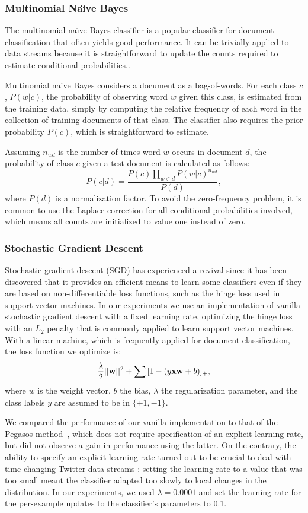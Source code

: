 \subsubsection{Multinomial Na\"{\i}ve Bayes}

The multinomial na\"{\i}ve Bayes classifier is a popular classifier
for document classification that often yields %
good performance. It can be trivially applied to data streams because it is
straightforward to update the counts required to estimate conditional
probabilities.. 

Multinomial naive Bayes considers a document as a bag-of-words. For
each class $c$, $P (w|c)$, the probability of observing word $w$ given
this class, is estimated from the training data, simply by computing
the relative frequency of each word in the collection of training
documents of that class. The classifier also requires the prior
probability $P (c)$, which is straightforward to estimate. 

Assuming $n_{wd}$ is the number of times word $w$ occurs in document
$d$, the probability of class $c$ given a test document is calculated
as follows:
$$P(c|d) =\frac{P(c) \prod_{w\in d} P(w|c)^{n_{wd}}}{P(d)},$$
where $P (d)$ is a normalization factor. To avoid the zero-frequency
problem, it is common to use the Laplace correction for all
conditional probabilities involved, which means all counts are
initialized to value one instead of zero.

\subsubsection{Stochastic Gradient Descent}

Stochastic gradient descent (SGD) has experienced a revival since it
has been discovered that it provides an efficient means to learn
some classifiers even if they are based on non-differentiable loss
functions, such as the hinge loss used in support vector machines. In
our experiments we use an implementation of vanilla stochastic
gradient descent with a fixed learning rate, optimizing the hinge loss
with an $L_2$ penalty that is commonly applied to learn support vector
machines. With a linear machine, which is frequently applied for document
classification, the loss function we optimize is:
$$\frac{\lambda}{2} ||\mathbf{w}||^2 + \sum{[1 - ( y \ensuremath{\mathbf{x}} \ensuremath{\mathbf{w}} +
  b )]_+},$$ where $w$ is the weight vector, $b$ the bias, $\lambda$ the
regularization parameter, and the class labels $y$ are assumed to be
in $\{+1,-1\}$.

We compared the performance of our vanilla implementation to that of
the Pegasos method~\cite{pegasos}, which does not require
specification of an explicit learning rate, but did not observe a gain
in performance using the latter. On the contrary, the ability to
specify an explicit learning rate turned out to be crucial to deal
with time-changing Twitter data streams : setting the learning rate to
a value that was too small meant the classifier adapted too slowly to
local changes in the distribution. In our experiments, we used
$\lambda=0.0001$ and set the learning rate for the per-example updates
to the classifier's parameters to 0.1.

